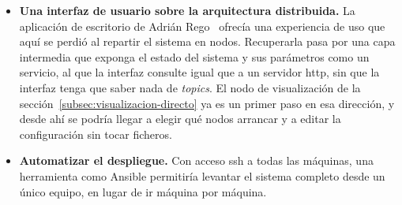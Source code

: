 \begin{itemize}
\item \textbf{Una interfaz de usuario sobre la arquitectura distribuida.} La aplicación de escritorio de Adrián Rego~\cite{tfgadrian} ofrecía una experiencia de uso que aquí se perdió al repartir el sistema en nodos. Recuperarla pasa por una capa intermedia que exponga el estado del sistema y sus parámetros como un servicio, al que la interfaz consulte igual que a un servidor \gls{http}, sin que la interfaz tenga que saber nada de \emph{topics}. El nodo de visualización de la sección~\ref{subsec:visualizacion-directo} ya es un primer paso en esa dirección, y desde ahí se podría llegar a elegir qué nodos arrancar y a editar la configuración sin tocar ficheros.

\item \textbf{Automatizar el despliegue.} Con acceso \gls{ssh} a todas las máquinas, una herramienta como Ansible permitiría levantar el sistema completo desde un único equipo, en lugar de ir máquina por máquina.
\end{itemize}
